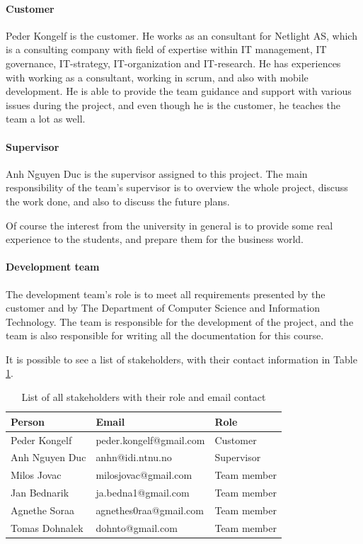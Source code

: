 \paragraph{Customer}
Peder Kongelf is the customer. He works as an consultant for Netlight AS, which is a consulting company with field of expertise within IT management, IT governance, IT-strategy, IT-organization and IT-research. He has experiences with working as a consultant, working in scrum, and also with mobile development. He is able to provide the team guidance and support with various issues during the project, and even though he is the customer, he teaches the team a lot as well.      

 
\paragraph{Supervisor}
Anh Nguyen Duc is the supervisor assigned to this project. 
The main responsibility of the team's supervisor is to overview the whole project, discuss the work done, and also to discuss the future plans. 

Of course the interest from the university in general is to provide some real experience to the students, and prepare them for the business world.

\paragraph{Development team}
The development team's role is to meet all requirements presented by the customer and by The Department of Computer Science and Information Technology. 
The team is responsible for the development of the project, and the team is also responsible for writing all the documentation for this course.  



It is possible to see a list of stakeholders, with their contact information in Table \ref{tab:stakeholders_summary}.

\begin{table}[!ht]\centering
\caption{List of all stakeholders with their role and email contact}
\label{tab:stakeholders_summary}
\def\arraystretch{1.3}
\begin{tabular}{lll}
\toprule[0.5mm]
\textbf{Person} & \textbf{Email} & \textbf{Role}\\
\midrule
Peder Kongelf & peder.kongelf@gmail.com  & Customer\\
\midrule
Anh Nguyen Duc	 & anhn@idi.ntnu.no & Supervisor \\
\midrule
Milos Jovac &  milosjovac@gmail.com & Team member  \\
Jan Bednarik &  ja.bedna1@gmail.com & Team member\\
Agnethe Soraa & agnethes0raa@gmail.com & Team member  \\
Tomas Dohnalek & dohnto@gmail.com & Team member \\
\bottomrule[0.5mm]
\end{tabular}
\end{table}

